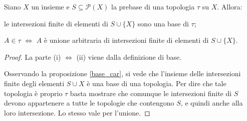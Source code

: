 \documentclass{article}
\begin{document}
\begin{prop}
	Siano $X$ un insieme e $S \subseteq \mathcal{P}(X)$ la prebase di una
	topologia $\tau$ su $X$. Allora:
	\begin{nlist}
		\item le intersezioni finite di elementi di $S \cup \{X\}$ sono una base
		di $\tau$;
		\item $A \in \tau$ $\Leftrightarrow$ $A$ è unione arbitraria di
		intersezioni finite di elementi di $S \cup \{X\}$.
	\end{nlist}
\end{prop}

\begin{proof}
La parte (i) $\Leftrightarrow$ (ii) viene dalla definizione di base.

Osservando la proposizione \ref{base_car}, si vede che l'insieme delle
intersezioni finite degli elementi $S \cup {X}$ \`e una base di una topologia.
Per dire che tale topologia \`e proprio $\tau$ basta mostrare che comunque le
intersezioni finite di $S$ devono appartenere a tutte le topologie che
contengono $S$, e quindi anche alla loro intersezione. Lo stesso vale per
l'unione.
\end{proof}
\end{document}
